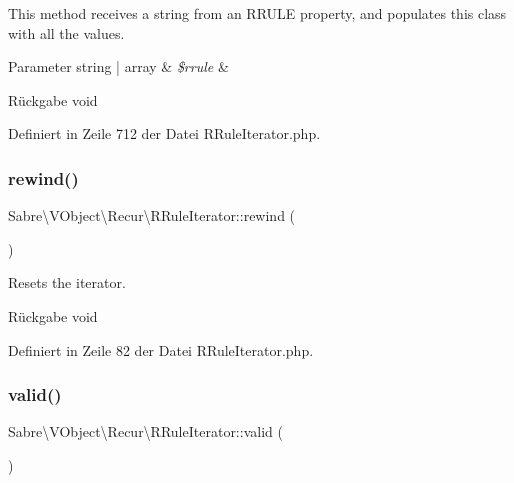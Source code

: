 This method receives a string from an R\+R\+U\+LE property, and populates this class with all the values.


\begin{DoxyParams}[1]{Parameter}
string | array & {\em \$rrule} & \\
\hline
\end{DoxyParams}
\begin{DoxyReturn}{Rückgabe}
void 
\end{DoxyReturn}


Definiert in Zeile 712 der Datei R\+Rule\+Iterator.\+php.

\mbox{\label{class_sabre_1_1_v_object_1_1_recur_1_1_r_rule_iterator_afe556e7068d776ddc1bdd7f033e0e98a}} 
\subsubsection{\texorpdfstring{rewind()}{rewind()}}
{\footnotesize\ttfamily Sabre\textbackslash{}\+V\+Object\textbackslash{}\+Recur\textbackslash{}\+R\+Rule\+Iterator\+::rewind (\begin{DoxyParamCaption}{ }\end{DoxyParamCaption})}

Resets the iterator.

\begin{DoxyReturn}{Rückgabe}
void 
\end{DoxyReturn}


Definiert in Zeile 82 der Datei R\+Rule\+Iterator.\+php.

\mbox{\label{class_sabre_1_1_v_object_1_1_recur_1_1_r_rule_iterator_aa22d459f9a434244a62cd0e7cd42fc79}} 
\subsubsection{\texorpdfstring{valid()}{valid()}}
{\footnotesize\ttfamily Sabre\textbackslash{}\+V\+Object\textbackslash{}\+Recur\textbackslash{}\+R\+Rule\+Iterator\+::valid (\begin{DoxyParamCaption}{ }\end{DoxyParamCaption})}

